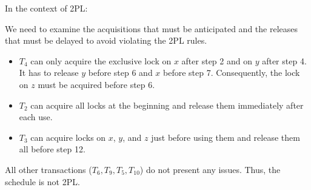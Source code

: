 In the context of 2PL:
\begin{table}[H]
    \centering
\end{table}
We need to examine the acquisitions that must be anticipated and the releases that must be delayed to avoid violating the 2PL rules.
\begin{itemize}
    \item $T_4$ can only acquire the exclusive lock on $x$ after step 2 and on $y$ after step 4. 
        It has to release $y$ before step 6 and $x$ before step 7. 
        Consequently, the lock on $z$ must be acquired before step 6.
    \item $T_2$ can acquire all locks at the beginning and release them immediately after each use.
    \item $T_3$ can acquire locks on $x$, $y$, and $z$ just before using them and release them all before step 12.
\end{itemize}
All other transactions ($T_6, T_9, T_5, T_{10}$) do not present any issues.
Thus, the schedule is not 2PL. 